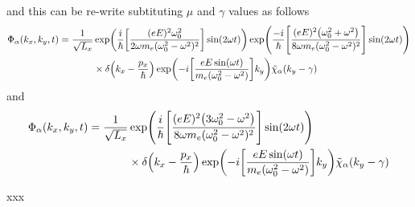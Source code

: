 and this can be re-write subtituting $\mu$ and $\gamma$ values as follows
\begin{equation} \label{3.35}
  \begin{aligned}
    \Phi_{\alpha}(k_x,k_y,t) =
    \frac{1}{\sqrt{L_x}} &
    \exp(
        \frac{i}{\hbar} \qty[
        \frac{(eE)^2 \omega_0^2 }{2 \omega m_e (\omega_0^2 - \omega^2)^2}
      ]\sin(2\omega t)
    )
    \exp(\frac{-i}{\hbar}
    \qty[
    \frac{(eE)^2\qty(\omega_0^2 + \omega^2)}{8\omega m_e(\omega_0^2 - \omega^2)^2}
    ]\sin(2\omega t)) \\
    & \times
    \delta\qty(k_x -\frac{p_x}{\hbar})
    \exp(-i\qty[\frac{eE\sin(\omega t)}{m_e(\omega_0^2 - \omega^2)}] k_y)
    \tilde{\chi}_{\alpha}\qty(k_y - \gamma)
  \end{aligned}
\end{equation}
and
\begin{equation} \label{3.34}
  \begin{aligned}
    \Phi_{\alpha}(k_x,k_y,t) =
    \frac{1}{\sqrt{L_x}} &
    \exp(
        \frac{i}{\hbar} \qty[
        \frac{(eE)^2 \qty(3\omega_0^2 - \omega^2) }{8 \omega m_e (\omega_0^2 - \omega^2)^2}
      ]\sin(2\omega t)
    )
    \\
    & \times
    \delta\qty(k_x -\frac{p_x}{\hbar})
    \exp(-i\qty[\frac{eE\sin(\omega t)}{m_e(\omega_0^2 - \omega^2)}] k_y)
    \tilde{\chi}_{\alpha}\qty(k_y - \gamma)
  \end{aligned}
\end{equation}
















xxx
